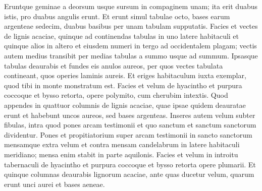 \begin{biblechapter}
\verse Eruntque geminae a deorsum usque sursum in compaginem unam; ita erit duabus istis, pro duabus angulis erunt. 
\verse Et erunt simul tabulae octo, bases earum argenteae sedecim, duabus basibus per unam tabulam supputatis. 
\verse Facies et vectes de lignis acaciae, quinque ad continendas tabulas in uno latere habitaculi 
\verse et quinque alios in altero et eiusdem numeri in tergo ad occidentalem plagam; 
\verse vectis autem medius transibit per medias tabulas a summo usque ad summum. 
\verse Ipsasque tabulas deaurabis et fundes eis anulos aureos, per quos vectes tabulata contineant, quos operies laminis aureis. 
\verse Et eriges habitaculum iuxta exemplar, quod tibi in monte monstratum est. 
\verse Facies et velum de hyacintho et purpura coccoque et bysso retorta, opere polymito, cum cherubim intextis. 
\verse Quod appendes in quattuor columnis de lignis acaciae, quae ipsae quidem deauratae erunt et habebunt uncos aureos, sed bases argenteas. 
\verse Inseres autem velum subter fibulas, intra quod pones arcam testimonii et quo sanctum et sanctum sanctorum dividentur. 
\verse Pones et propitiatorium super arcam testimonii in sancto sanctorum 
\verse mensamque extra velum et contra mensam candelabrum in latere habitaculi meridiano; mensa enim stabit in parte aquilonis. 
\verse Facies et velum in introitu tabernaculi de hyacintho et purpura coccoque et bysso retorta opere plumarii. 
\verse Et quinque columnas deaurabis lignorum acaciae, ante quas ducetur velum, quarum erunt unci aurei et bases aeneae. 
\end{biblechapter}

